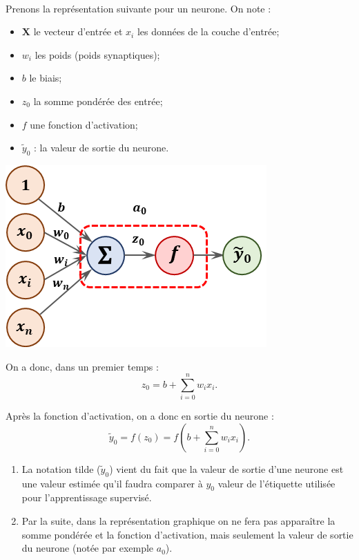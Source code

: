 \begin{defi} ~\\


\begin{minipage}[c]{.55\linewidth}
Prenons la représentation suivante pour un neurone. On note :
\begin{itemize}
\item $\mathbf{X}$ le vecteur d'entrée et $x_i$ les données de la couche d'entrée;
\item $w_i$ les poids (poids synaptiques);
\item $b$ le biais;
\item $z_0$ la somme pondérée des entrée;
\item $f$ une fonction d'activation; 
\item $\tilde{y}_0$ : la valeur de sortie du neurone.
\end{itemize}
\end{minipage}
\hfill
\begin{minipage}[c]{.4\linewidth}
\begin{center}
\includegraphics[width=.9\linewidth]{images/fig_01}
\end{center}
\end{minipage}

On a donc, dans un premier temps  :
$$z_0 = b+ \sum\limits_{i=0}^{n} w_i x_i. $$

Après la fonction d'activation, on a donc en sortie du neurone :
$$\tilde{y}_0 = f(z_0)=f \left( b+ \sum\limits_{i=0}^{n} w_i x_i\right).$$

\begin{rem}
\begin{enumerate}
\item La notation tilde ($\tilde{y}_0$) vient du fait que la valeur de sortie d'une neurone est une valeur estimée qu'il faudra comparer à ${y}_0$ valeur de l'étiquette utilisée pour l'apprentissage supervisé.
\item Par la suite, dans la représentation graphique on ne fera pas apparaître la somme pondérée et la fonction d'activation, mais seulement la valeur de sortie du neurone (notée par exemple $a_0$).
\end{enumerate}
\end{rem}

\end{defi}




